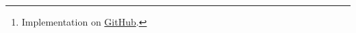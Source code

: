 \begin{abstract}
    \begin{center}
        Following \cite{Nakatsukasa2022}, this report presents some results in randomized numerical linear algebra, along with the theory of the Sketched \textit{GMRES} method and its implementation\footnote{Implementation on \href{https://github.com/diantonioandrea/NASS}{GitHub}.} details.
    \end{center}
\end{abstract}